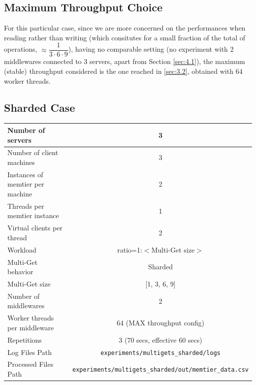 \documentclass[11pt,a4paper]{article}
\begin{document}
\subsection*{Maximum Throughput Choice}
For this particular case, since we are more concerned on the performances when reading rather than writing (which consitutes for a small fraction of the total of operations, $\approx \dfrac{1}{3 \cdot 6 \cdot 9}$), having no comparable setting (no experiment with 2 middlewares connected to 3 servers, apart from Section \ref{sec:4.1}), the maximum (stable) throughput considered is the one reached in \ref{sec:3.2}, obtained with 64 worker threads.

\subsection{Sharded Case}

\begin{center}
	\scriptsize{
		\begin{tabular}{|l|c|}
			\hline Number of servers                & 3                       \\ 
			\hline Number of client machines        & 3                       \\ 
			\hline Instances of memtier per machine & 2                       \\ 
			\hline Threads per memtier instance     & 1                       \\
			\hline Virtual clients per thread       & 2     		            \\ 
			\hline Workload                         & ratio=1:$<$Multi-Get size$>$             \\
			\hline Multi-Get behavior               & Sharded                 \\
			\hline Multi-Get size                   & [1, 3, 6, 9]            \\
			\hline Number of middlewares            & 2                       \\
            \hline Worker threads per middleware    & 64 (MAX throughput config) \\
            \hline Repetitions                      & 3 (70 secs, effective 60 secs) \\ 
            \hline Log Files Path                   & \texttt{experiments/multigets\_sharded/logs} \\
            \hline Processed Files Path             & \texttt{experiments/multigets\_sharded/out/memtier\_data.csv}\\
            \hline
		\end{tabular}
	} 
\end{center}
\end{document}
